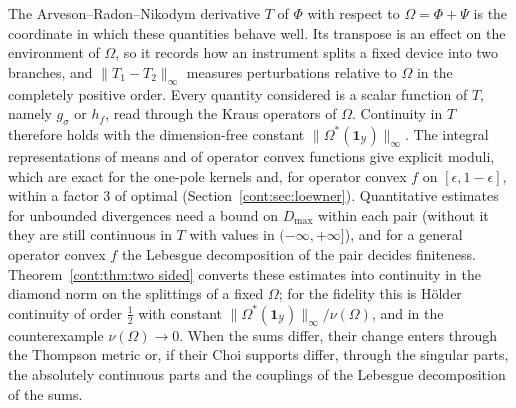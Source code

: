 The Arveson--Radon--Nikodym derivative $T$ of $\Phi$ with respect to $\Omega=\Phi+\Psi$ is the coordinate in which these quantities behave well. Its transpose is an effect on the environment of $\Omega$, so it records how an instrument splits a fixed device into two branches, and $\|T_1-T_2\|_\infty$ measures perturbations relative to $\Omega$ in the completely positive order. Every quantity considered is a scalar function of $T$, namely $g_\sigma$ or $h_f$, read through the Kraus operators of $\Omega$. Continuity in $T$ therefore holds with the dimension-free constant $\|\Omega^*(\mathbf{1}_{\mathcal{Y}})\|_\infty$. The integral representations of means and of operator convex functions give explicit moduli, which are exact for the one-pole kernels and, for operator convex $f$ on $[\epsilon,1-\epsilon]$, within a factor $3$ of optimal (Section~\ref{cont:sec:loewner}). Quantitative estimates for unbounded divergences need a bound on $D_{\max}$ within each pair (without it they are still continuous in $T$ with values in $(-\infty,+\infty]$), and for a general operator convex $f$ the Lebesgue decomposition of the pair decides finiteness. Theorem~\ref{cont:thm:two sided} converts these estimates into continuity in the diamond norm on the splittings of a fixed $\Omega$; for the fidelity this is H\"older continuity of order $\frac12$ with constant $\|\Omega^*(\mathbf{1}_{\mathcal{Y}})\|_\infty/\nu(\Omega)$, and in the counterexample $\nu(\Omega)\to0$. When the sums differ, their change enters through the Thompson metric or, if their Choi supports differ, through the singular parts, the absolutely continuous parts and the couplings of the Lebesgue decomposition of the sums.


